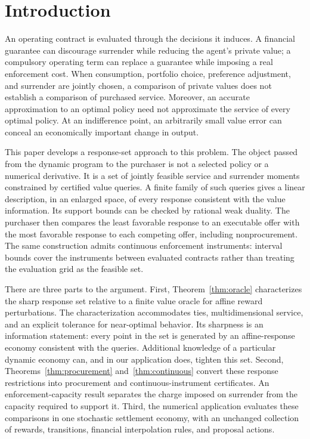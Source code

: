 \section{Introduction}
An operating contract is evaluated through the decisions it induces. A financial guarantee can discourage surrender while reducing the agent's private value; a compulsory operating term can replace a guarantee while imposing a real enforcement cost. When consumption, portfolio choice, preference adjustment, and surrender are jointly chosen, a comparison of private values does not establish a comparison of purchased service. Moreover, an accurate approximation to an optimal policy need not approximate the service of every optimal policy. At an indifference point, an arbitrarily small value error can conceal an economically important change in output.

This paper develops a response-set approach to this problem. The object passed from the dynamic program to the purchaser is not a selected policy or a numerical derivative. It is a set of jointly feasible service and surrender moments constrained by certified value queries. A finite family of such queries gives a linear description, in an enlarged space, of every response consistent with the value information. Its support bounds can be checked by rational weak duality. The purchaser then compares the least favorable response to an executable offer with the most favorable response to each competing offer, including nonprocurement. The same construction admits continuous enforcement instruments: interval bounds cover the instruments between evaluated contracts rather than treating the evaluation grid as the feasible set.

There are three parts to the argument. First, Theorem~\ref{thm:oracle} characterizes the sharp response set relative to a finite value oracle for affine reward perturbations. The characterization accommodates ties, multidimensional service, and an explicit tolerance for near-optimal behavior. Its sharpness is an information statement: every point in the set is generated by an affine-response economy consistent with the queries. Additional knowledge of a particular dynamic economy can, and in our application does, tighten this set. Second, Theorems~\ref{thm:procurement} and~\ref{thm:continuous} convert these response restrictions into procurement and continuous-instrument certificates. An enforcement-capacity result separates the charge imposed on surrender from the capacity required to support it. Third, the numerical application evaluates these comparisons in one stochastic settlement economy, with an unchanged collection of rewards, transitions, financial interpolation rules, and proposal actions.

